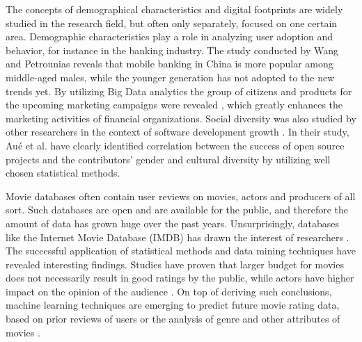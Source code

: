 The concepts of demographical characteristics and digital footprints are widely studied in the research field, but often only separately, focused on one certain area. Demographic characteristics play a role in analyzing user adoption and behavior, for instance in the banking industry. The study conducted by Wang and Petrounias \cite{chinesemobilebankingusers} reveals that mobile banking in China is more popular among middle-aged males, while the younger generation has not adopted to the new trends yet. By utilizing Big Data analytics the group of citizens and products for the upcoming marketing campaigns were revealed \cite{chinesemobilebankingusers}, which greatly enhances the marketing activities of financial organizations. Social diversity was also studied by other researchers in the context of software development growth \cite{socialdiversityongithub}. In their study, Au\'e et al. \cite{socialdiversityongithub} have clearly identified correlation between the success of open source projects and the contributors' gender and cultural diversity by utilizing well chosen statistical methods. 

Movie databases often contain user reviews on movies, actors and producers of all sort. Such databases are open and are available for the public, and therefore the amount of data has grown huge over the past years. Unsurprisingly, databases like the Internet Movie Database (IMDB) has drawn the interest of researchers \cite{saraee2004data, kabinsingha2012movie, sumathi2013performance}. The successful application of statistical methods and data mining techniques have revealed interesting findings. Studies have proven that larger budget for movies does not necessarily result in good ratings by the public, while actors have higher impact on the opinion of the audience \cite{saraee2004data}. On top of deriving such conclusions, machine learning techniques are emerging to predict future movie rating data, based on prior reviews of users \cite{saraee2004data} or the analysis of genre and other attributes of movies \cite{kabinsingha2012movie}.

